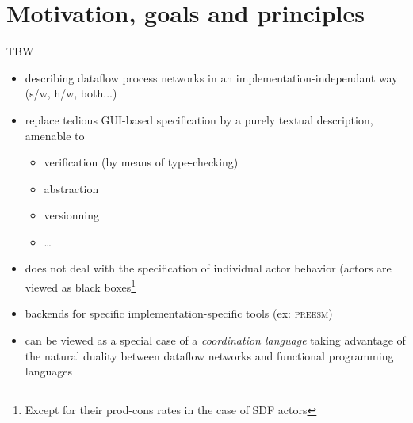 \clearpage

\section{Motivation, goals and principles}

TBW

\begin{itemize}
\item describing dataflow process networks in an implementation-independant way (s/w, h/w, both...)
\item replace tedious GUI-based specification by a purely textual description, amenable to
  \begin{itemize}
  \item verification (by means of type-checking)
  \item abstraction
  \item versionning
  \item \ldots
  \end{itemize}
\item does not deal with the specification of individual actor behavior (actors are viewed as black
  boxes\footnote{Except for their prod-cons rates in the case of SDF actors}
\item backends for specific implementation-specific tools (ex: \textsc{preesm})
\item can be viewed as a special case of a \emph{coordination language} taking advantage of the
  natural duality between dataflow networks and functional programming languages
\end{itemize}


